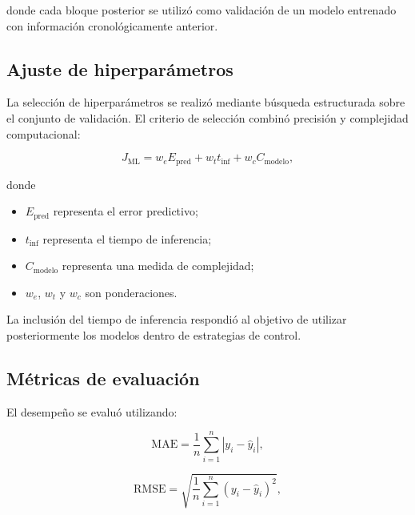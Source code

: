 donde cada bloque posterior se utilizó como validación de un modelo entrenado con información cronológicamente anterior.

\subsection{Ajuste de hiperparámetros}
\label{subsec:ajuste_hiperparametros}

La selección de hiperparámetros se realizó mediante búsqueda estructurada sobre el conjunto de validación. El criterio de selección combinó precisión y complejidad computacional:

\begin{equation}
J_{\mathrm{ML}}
=
w_e E_{\mathrm{pred}}
+
w_t t_{\mathrm{inf}}
+
w_c C_{\mathrm{modelo}},
\label{eq:criterio_ml}
\end{equation}

donde

\begin{itemize}
    \item $E_{\mathrm{pred}}$ representa el error predictivo;
    \item $t_{\mathrm{inf}}$ representa el tiempo de inferencia;
    \item $C_{\mathrm{modelo}}$ representa una medida de complejidad;
    \item $w_e$, $w_t$ y $w_c$ son ponderaciones.
\end{itemize}

La inclusión del tiempo de inferencia respondió al objetivo de utilizar posteriormente los modelos dentro de estrategias de control.

\subsection{Métricas de evaluación}
\label{subsec:metricas_modelos_datos}

El desempeño se evaluó utilizando:

\begin{equation}
\mathrm{MAE}
=
\frac{1}{n}
\sum_{i=1}^{n}
|y_i-\hat{y}_i|,
\end{equation}

\begin{equation}
\mathrm{RMSE}
=
\sqrt{
\frac{1}{n}
\sum_{i=1}^{n}
(y_i-\hat{y}_i)^2
},
\end{equation}

